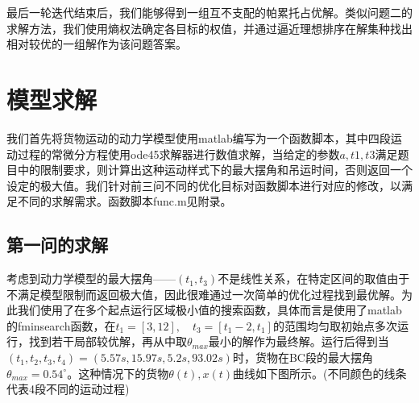 \documentclass[withoutpreface,bwprint]{cumcmthesis} %
\begin{document}
最后一轮迭代结束后，我们能够得到一组互不支配的帕累托占优解。类似问题二的求解方法，我们使用熵权法确定各目标的权值，并通过逼近理想排序在解集种找出相对较优的一组解作为该问题答案。

\section{模型求解}
我们首先将货物运动的动力学模型使用matlab编写为一个函数脚本，其中四段运动过程的常微分方程使用ode45求解器进行数值求解，当给定的参数$a,t1,t3$满足题目中的限制要求，则计算出这种运动样式下的最大摆角和吊运时间，否则返回一个设定的极大值。我们针对前三问不同的优化目标对函数脚本进行对应的修改，以满足不同的求解需求。函数脚本func.m见附录。

\subsection{第一问的求解}
考虑到动力学模型的最大摆角——$(t_1,t_3)$不是线性关系，在特定区间的取值由于不满足模型限制而返回极大值，因此很难通过一次简单的优化过程找到最优解。为此我们使用了在多个起点运行区域极小值的搜索函数，具体而言是使用了matlab的fminsearch函数，在$t_1=[3,12],\quad t_3=[t_1-2,t_1]$的范围均匀取初始点多次运行，找到若干局部较优解，再从中取$\theta_{max}$最小的解作为最终解。运行后得到当$(t_1,t_2,t_3,t_4)=(5.57s,15.97s,5.2s,93.02s)$时，货物在BC段的最大摆角$\theta_{max}=0.54^{\circ}$。这种情况下的货物$\theta(t),x(t)$曲线如下图所示。(不同颜色的线条代表4段不同的运动过程)
\end{document}
